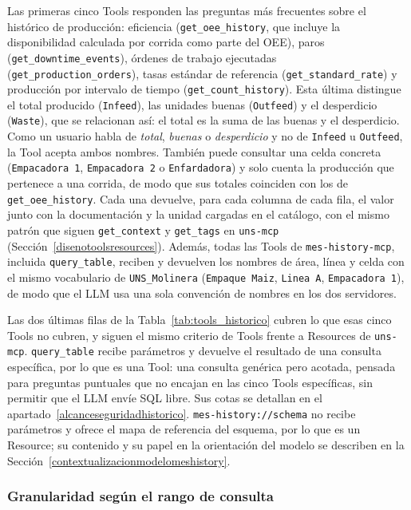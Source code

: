 Las primeras cinco Tools responden las preguntas más frecuentes sobre el histórico de
producción: eficiencia (\texttt{get\_oee\_history}, que incluye la disponibilidad calculada
por corrida como parte del OEE), paros (\texttt{get\_downtime\_events}), órdenes de trabajo
ejecutadas (\texttt{get\_production\_orders}), tasas estándar de referencia
(\texttt{get\_standard\_rate}) y producción por intervalo de tiempo
(\texttt{get\_count\_history}). Esta última distingue el total producido
(\texttt{Infeed}), las unidades buenas (\texttt{Outfeed}) y el desperdicio
(\texttt{Waste}), que se relacionan así: el total es la suma de las buenas y el
desperdicio. Como un usuario habla de \textit{total}, \textit{buenas} o
\textit{desperdicio} y no de \texttt{Infeed} u \texttt{Outfeed}, la Tool acepta ambos
nombres. También puede consultar una celda concreta (\texttt{Empacadora 1},
\texttt{Empacadora 2} o \texttt{Enfardadora}) y solo cuenta la producción que
pertenece a una corrida, de modo que sus totales coinciden con los de
\texttt{get\_oee\_history}. Cada una devuelve, para cada columna de cada fila, el valor
junto con la documentación y la unidad cargadas en el catálogo, con el mismo patrón que siguen
\texttt{get\_context} y \texttt{get\_tags} en \texttt{uns-mcp}
(Sección~\ref{disenotoolsresources}). Además, todas las Tools de \texttt{mes-history-mcp},
incluida \texttt{query\_table}, reciben y devuelven los nombres de área, línea y celda con el
mismo vocabulario de \texttt{UNS\_Molinera} (\texttt{Empaque Maiz}, \texttt{Linea A},
\texttt{Empacadora 1}), de modo que el LLM usa una sola convención de nombres en los dos
servidores.

Las dos últimas filas de la Tabla~\ref{tab:tools_historico} cubren lo que esas cinco Tools no
cubren, y siguen el mismo criterio de Tools frente a Resources de \texttt{uns-mcp}.
\texttt{query\_table} recibe parámetros y devuelve el resultado de una consulta específica,
por lo que es una Tool: una consulta genérica pero acotada, pensada para preguntas puntuales
que no encajan en las cinco Tools específicas, sin permitir que el LLM envíe SQL libre. Sus
cotas se detallan en el apartado~\ref{alcanceseguridadhistorico}. \texttt{mes-history://schema}
no recibe parámetros y ofrece el mapa de referencia del esquema, por lo que es un Resource; su
contenido y su papel en la orientación del modelo se describen en la
Sección~\ref{contextualizacionmodelomeshistory}.

\subsubsection{Granularidad según el rango de consulta}
\label{granularidadconsulta}

